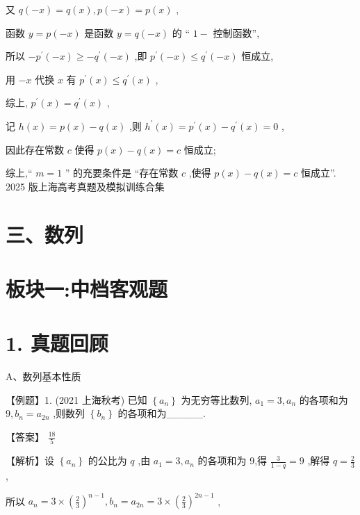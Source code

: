 \documentclass[10pt]{article}
\begin{document}
又 \(q\left( {-x}\right)  = q\left( x\right) ,p\left( {-x}\right)  = p\left( x\right)\) ,

函数 \(y = p\left( {-x}\right)\) 是函数 \(y = q\left( {-x}\right)\) 的 “ \(1 -\) 控制函数”,

所以 \(- {p}^{\prime }\left( {-x}\right)  \geq   - {q}^{\prime }\left( {-x}\right)\) ,即 \({p}^{\prime }\left( {-x}\right)  \leq  {q}^{\prime }\left( {-x}\right)\) 恒成立,

用 \(- x\) 代换 \(x\) 有 \({p}^{\prime }\left( x\right)  \leq  {q}^{\prime }\left( x\right)\) ,

综上, \({p}^{\prime }\left( x\right)  = {q}^{\prime }\left( x\right)\) ,

记 \(h\left( x\right)  = p\left( x\right)  - q\left( x\right)\) ,则 \({h}^{\prime }\left( x\right)  = {p}^{\prime }\left( x\right)  - {q}^{\prime }\left( x\right)  = 0\) ,

因此存在常数 \(c\) 使得 \(p\left( x\right)  - q\left( x\right)  = c\) 恒成立;

综上,“ \(m = 1\) ” 的充要条件是 “存在常数 \(c\) ,使得 \(p\left( x\right)  - q\left( x\right)  = c\) 恒成立”. 2025 版上海高考真题及模拟训练合集

\section*{三、数列}

\section*{板块一:中档客观题}

\section*{1. 真题回顾}

A、数列基本性质

【例题】1. (2021 上海秋考) 已知 \(\left\{  {a}_{n}\right\}\) 为无穷等比数列, \({a}_{1} = 3,{a}_{n}\) 的各项和为 \(9,{b}_{n} = {a}_{2n}\) ,则数列 \(\left\{  {b}_{n}\right\}\) 的各项和为\_\_\_\_\_.

【答案】 \(\frac{18}{5}\)

【解析】设 \(\left\{  {a}_{n}\right\}\) 的公比为 \(q\) ,由 \({a}_{1} = 3,{a}_{n}\) 的各项和为 9,得 \(\frac{3}{1 - q} = 9\) ,解得 \(q = \frac{2}{3}\) ,

所以 \({a}_{n} = 3 \times  {\left( \frac{2}{3}\right) }^{n - 1},{b}_{n} = {a}_{2n} = 3 \times  {\left( \frac{2}{3}\right) }^{{2n} - 1}\) ,
\end{document}
